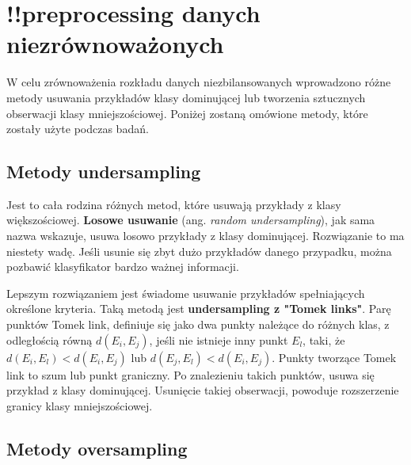 


\section{!!preprocessing danych niezrównoważonych}
W celu zrównoważenia rozkładu danych niezbilansowanych wprowadzono różne metody usuwania przykładów klasy dominującej lub tworzenia sztucznych obserwacji klasy mniejszościowej. Poniżej zostaną omówione metody, które zostały użyte podczas badań.
\subsection{Metody undersampling}
Jest to cała rodzina różnych metod, które usuwają przykłady z klasy większościowej. \textbf{Losowe usuwanie} (ang. \textit{random undersampling}), jak sama nazwa wskazuje, usuwa losowo przykłady z klasy dominującej. Rozwiązanie to ma niestety wadę. Jeśli usunie się zbyt dużo przykładów danego przypadku, można pozbawić klasyfikator bardzo ważnej informacji. \par
Lepszym rozwiązaniem jest świadome usuwanie przykładów spełniających określone kryteria. Taką metodą jest \textbf{undersampling z "Tomek links"}. Parę punktów Tomek link, definiuje się jako dwa punkty należące do różnych klas, z odległością równą $d(E_i,E_j)$, jeśli nie istnieje inny punkt $E_l$, taki, że $d(E_i,E_l) < d(E_i,E_j)$ lub $d(E_j,E_l) < d(E_i,E_j)$. Punkty tworzące Tomek link to szum lub punkt graniczny. Po znalezieniu takich punktów, usuwa się przykład z klasy dominującej. Usunięcie takiej obserwacji, powoduje rozszerzenie granicy klasy mniejszościowej. \par
{}

\subsection{Metody oversampling}